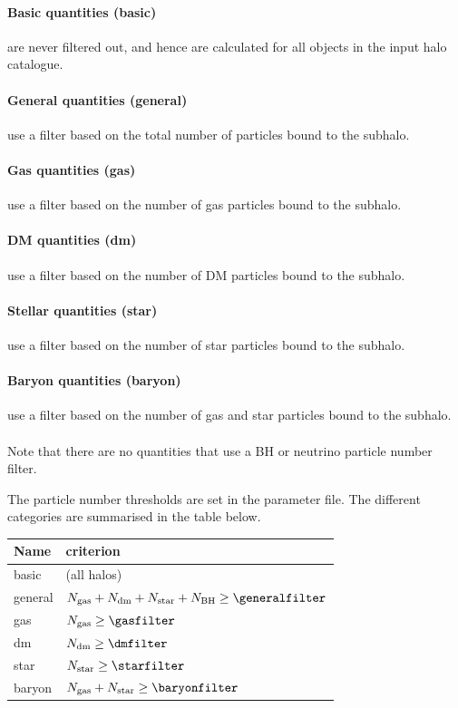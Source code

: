 \documentclass{article}
\begin{document}
\paragraph{Basic quantities (basic)} are never filtered out, and hence are calculated for all objects in the
input halo catalogue.

\paragraph{General quantities (general)} use a filter based on the total number of particles bound to the 
subhalo.

\paragraph{Gas quantities (gas)} use a filter based on the number of gas particles bound to the subhalo. 

\paragraph{DM quantities (dm)} use a filter based on the number of DM particles bound to the subhalo.

\paragraph{Stellar quantities (star)} use a filter based on the number of star particles bound to the 
subhalo.

\paragraph{Baryon quantities (baryon)} use a filter based on the number of gas and star particles 
bound to the subhalo.

\paragraph{}Note that there are no quantities that use a BH or neutrino particle number filter.

The particle number thresholds are set in the parameter file. The different categories are summarised in the table below.

\begin{longtable}{ll}
Name & criterion \\
\hline{}basic & (all halos) \\
general & $N_{\rm{}gas}+N_{\rm{}dm}+N_{\rm{}star}+N_{\rm{}BH} \geq{} \generalfilter$ \\
gas & $N_{\rm{}gas} \geq{} \gasfilter$ \\
dm & $N_{\rm{}dm} \geq{} \dmfilter$ \\
star & $N_{\rm{}star} \geq{} \starfilter$ \\
baryon & $N_{\rm{}gas}+N_{\rm{}star} \geq{} \baryonfilter$ \\
\end{longtable}
\end{document}
